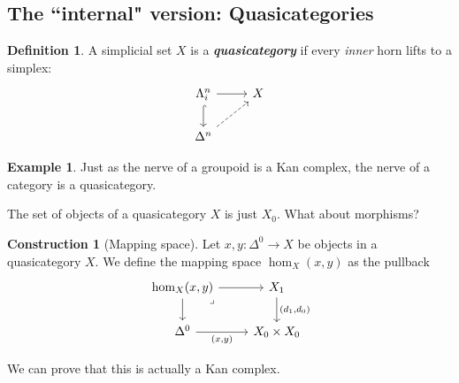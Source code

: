 \documentclass{article}
\newcommand{\textbi}[1]{\textbf{\textit{#1}}}
\theoremstyle{definition}
\newtheorem{defin}[subsection]{Definition}
\newtheorem{ex}[subsection]{Example}
\newtheorem{cons}[subsection]{Construction}
\begin{document}
\subsection*{The ``internal" version: Quasicategories}

\begin{defin}
    A simplicial set $X$ is a \textbi{quasicategory} if every \textit{inner} horn lifts to a simplex: 
    \[\begin{tikzcd}
        \Lambda^n_i\arrow[r] & X \\ 
        \Delta^n \arrow[from=u, hook] \arrow[ur, dashed]
    \end{tikzcd}\]
\end{defin}

\begin{ex}
    Just as the nerve of a groupoid is a Kan complex, the nerve of a category is a quasicategory.
\end{ex}

The set of objects of a quasicategory $X$ is just $X_0$. What about morphisms?

\begin{cons}[Mapping space]
    Let $x,y:\Delta^0\to X$ be objects in a quasicategory $X$. We define the mapping space $\hom_X(x,y)$ as the pullback 
    \[\begin{tikzcd}
        {\hom_X(x,y)} & {X_1} \\
        {\Delta^0} & {X_0\times X_0}
        \arrow[from=1-1, to=1-2]
        \arrow["{(d_1, d_0)}", from=1-2, to=2-2]
        \arrow[from=1-1, to=2-1]
        \arrow["{(x,y)}"', from=2-1, to=2-2]
        \arrow["\lrcorner"{anchor=center, pos=0.125}, draw=none, from=1-1, to=2-2]
    \end{tikzcd}\]
\end{cons}

We can prove that this is actually a Kan complex. 
\end{document}
